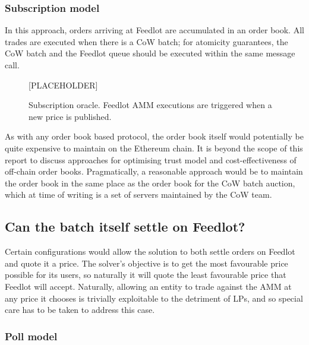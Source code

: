 \documentclass[a4paper,10pt]{article}
\begin{document}
\subsubsection{Subscription model}

In this approach, orders arriving at Feedlot are accumulated in an order book.
%
All trades are executed when there is a CoW batch; for atomicity guarantees, the CoW batch and the Feedlot queue should be executed within the same message call.
\begin{figure}
  \begin{center}
    [PLACEHOLDER]%
    \caption{Subscription oracle. Feedlot AMM executions are triggered when a new price is published.}
  \end{center}
\end{figure}

As with any order book based protocol, the order book itself would potentially be quite expensive to maintain on the Ethereum chain.
%
It is beyond the scope of this report to discuss approaches for optimising trust model and cost-effectiveness of off-chain order books.
%
Pragmatically, a reasonable approach would be to maintain the order book in the same place as the order book for the CoW batch auction, which at time of writing is a set of servers maintained by the CoW team.

\subsection{Can the batch itself settle on Feedlot?}
\label{solution-on-feedlot}

Certain configurations would allow the solution to both settle orders on Feedlot and quote it a price.
%
The solver's objective is to get the most favourable price possible for its users, so naturally it will quote the least favourable price that Feedlot will accept.
%
Naturally, allowing an entity to trade against the AMM at any price it chooses is trivially exploitable to the detriment of LPs, and so special care has to be taken to address this case.


\subsubsection{Poll model}
\end{document}
